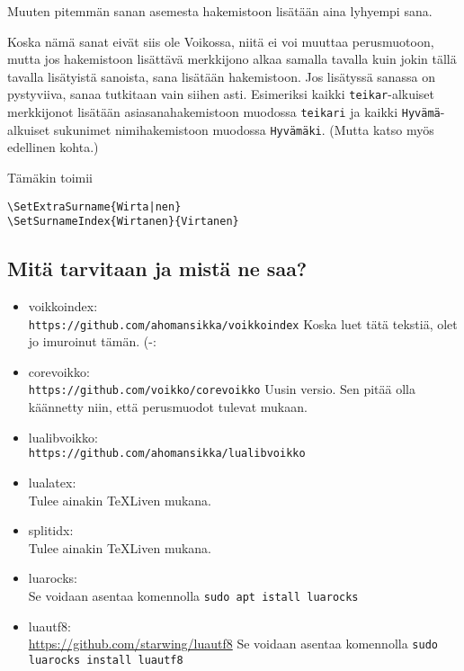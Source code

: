 \documentclass[12pt]{article}
\begin{document}
Muuten pitemmän sanan asemesta hakemistoon lisätään aina lyhyempi
sana.

Koska nämä sanat eivät siis ole Voikossa, niitä ei voi muuttaa
perusmuotoon, mutta jos hakemistoon lisättävä merkkijono alkaa samalla
tavalla kuin jokin tällä tavalla lisätyistä sanoista, sana lisätään
hakemistoon. Jos lisätyssä sanassa on pystyviiva, sanaa tutkitaan vain
siihen asti. Esimeriksi kaikki \verb=teikar=-alkuiset merkkijonot
lisätään asiasanahakemistoon muodossa \verb=teikari= ja kaikki
\verb=Hyvämä=-alkuiset sukunimet nimihakemistoon muodossa
\verb=Hyvämäki=. (Mutta katso myös edellinen kohta.)

Tämäkin toimii

\begin{verbatim}
\SetExtraSurname{Wirta|nen}
\SetSurnameIndex{Wirtanen}{Virtanen}
\end{verbatim}


\subsection*{Mitä tarvitaan ja mistä ne saa?}

\begin{itemize}
\item voikkoindex: \\
      \verb=https://github.com/ahomansikka/voikkoindex=
      Koska luet tätä tekstiä, olet jo imuroinut tämän. (-:

\item corevoikko: \\
      \verb=https://github.com/voikko/corevoikko=
      Uusin versio. Sen pitää olla käännetty niin, että perusmuodot
      tulevat mukaan.

\item lualibvoikko: \\
      \verb=https://github.com/ahomansikka/lualibvoikko=

\item lualatex: \\
      Tulee ainakin TeXLiven mukana.

\item splitidx: \\
      Tulee ainakin TeXLiven mukana.

\item luarocks: \\
      Se voidaan asentaa komennolla
      \verb=sudo apt istall luarocks=

\item luautf8: \\
      \url{https://github.com/starwing/luautf8}
      Se voidaan asentaa komennolla
      \verb=sudo luarocks install luautf8=
\end{itemize}
\end{document}
